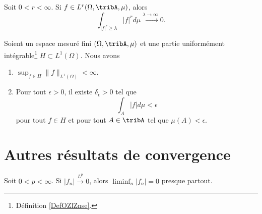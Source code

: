 \begin{proposition}	\label{PROPooPFZJooLySrgp}
	Soit \( 0<r<\infty\). Si \( f\in L^r(\Omega,\tribA,\mu)\), alors
	\begin{equation}
		\int_{| f |^r\geq \lambda}| f |^rd\mu\stackrel{ \lambda\to \infty}{\longrightarrow} 0.
	\end{equation}
\end{proposition}


\begin{theorem}	\label{THOooGLYJooCbNysA}
	Soient un espace mesuré fini \( (\Omega,\tribA,\mu)\) et une partie uniformément intégrable\footnote{Définition \ref{DefOZlZnse}.} \( H\subset L^1(\Omega)\). Nous avons
	\begin{enumerate}
		\item		\label{ITEMooCAIFooHXOKQb}
		      \( \sup_{f\in H}\| f \|_{L^1(\Omega)}<\infty\).
		\item
		      Pour tout \( \epsilon>0\), il existe \( \delta_{\epsilon}>0\) tel que
		      \begin{equation}
			      \int_A| f |d\mu<\epsilon
		      \end{equation}
		      pour tout \( f\in H\) et pour tout \( A\in\tribA\) tel que \( \mu(A)<\epsilon\).
	\end{enumerate}
\end{theorem}


\section{Autres résultats de convergence}


\begin{proposition}	\label{PROPooGJBIooAYsZQL}
	Soit \( 0<p<\infty\). Si \( | f_n |\stackrel{ L^p}{\longrightarrow} 0\), alors \( \liminf_n| f_n |=0\) presque partout.
\end{proposition}

